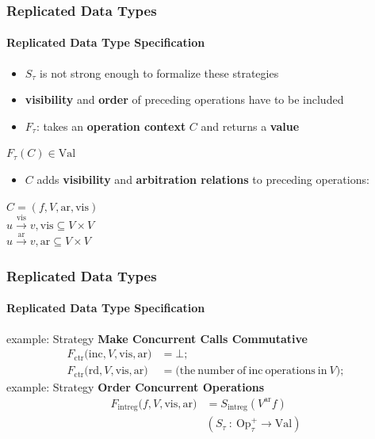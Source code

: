 \documentclass[11pt]{beamer}
\begin{document}
\begin{frame}
\frametitle{Replicated Data Types}
\framesubtitle{Replicated Data Type Specification}
\begin{itemize}
\item \(S_{\tau}\) is not strong enough to formalize these strategies
\item \textbf{visibility} and \textbf{order} of preceding operations have to be included
\pause
\item \(F_\tau\): takes an \textbf{operation context} \(C\) and returns a \textbf{value}
\end{itemize}

\begin{center}
\(F_\tau(C) \in \mathrm{Val}\) \\
\end{center}
\pause
\begin{itemize}
\item \(C\) adds \textbf{visibility} and \textbf{arbitration relations} to preceding operations:
\end{itemize}

\begin{center}
\(C = (f, V, \mathrm{ar}, \mathrm{vis})\) \\
\pause
\(u \xrightarrow{\mathrm{vis}} v, \mathrm{vis} \subseteq V \times V  \) \\
\(u \xrightarrow{\mathrm{ar}} v, \mathrm{ar} \subseteq V \times V  \)
\end{center}

\end{frame}

\begin{frame}
\frametitle{Replicated Data Types}
\framesubtitle{Replicated Data Type Specification}
example: Strategy \textbf{Make Concurrent Calls Commutative}
\begin{align*}
F_{\mathrm{ctr}} \mathrm{(inc}, V, \mathrm{vis, ar)} &= \bot; \\
F_{\mathrm{ctr}} \mathrm{(rd}, V, \mathrm{vis, ar)} &= \mathrm{(the\ number\ of\ inc\ operations\ in\ } V);
\end{align*}
\pause
example: Strategy \textbf{Order Concurrent Operations}
\begin{align*}
F_{\mathrm{intreg}} (f, V, \mathrm{vis, ar)} &= S_{\mathrm{intreg}}(V^{\mathrm{ar}} f) \\
&(S_{\tau}\ :\ \mathrm{Op}_\tau^+ \rightarrow \mathrm{Val})
\end{align*}
\end{frame}
\end{document}
